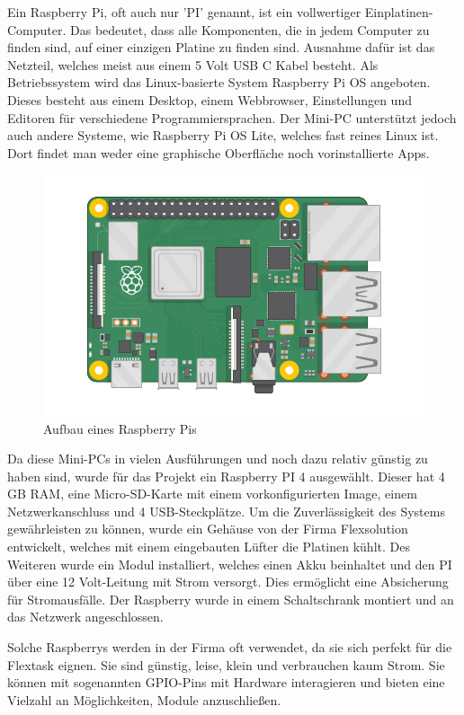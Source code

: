 Ein Raspberry Pi, oft auch nur 'PI' genannt, ist ein vollwertiger Einplatinen-Computer. Das bedeutet, dass alle Komponenten, die in jedem Computer zu finden sind, auf einer einzigen Platine zu finden sind. Ausnahme dafür ist das Netzteil, welches meist aus einem 5 Volt USB C Kabel besteht. Als Betriebssystem wird das Linux-basierte System Raspberry Pi OS angeboten. Dieses besteht aus einem Desktop, einem Webbrowser, Einstellungen und Editoren für verschiedene Programmiersprachen. Der Mini-PC unterstützt jedoch auch andere Systeme, wie Raspberry Pi OS Lite, welches fast reines Linux ist. Dort findet man weder eine graphische Oberfläche noch vorinstallierte Apps.  

\begin{figure}[h t]
    \centering
    \includegraphics[scale=0.5]{pics/raspberry-pi.png}
    \caption{Aufbau eines Raspberry Pis}
    \label{fig:impl:RaspiAufbau}
  \end{figure}

  Da diese Mini-PCs in vielen Ausführungen und noch dazu relativ günstig zu haben sind, wurde für das Projekt ein Raspberry PI 4 ausgewählt. Dieser hat 4 GB RAM, eine Micro-SD-Karte mit einem vorkonfigurierten Image, einem Netzwerkanschluss und 4 USB-Steckplätze. Um die Zuverlässigkeit des Systems gewährleisten zu können, wurde ein Gehäuse von der Firma Flexsolution entwickelt, welches mit einem eingebauten Lüfter die Platinen kühlt. Des Weiteren wurde ein Modul installiert, welches einen Akku beinhaltet und den PI über eine 12 Volt-Leitung mit Strom versorgt. Dies ermöglicht eine Absicherung für Stromausfälle. Der Raspberry wurde in einem Schaltschrank montiert und an das Netzwerk angeschlossen.   

Solche Raspberrys werden in der Firma oft verwendet, da sie sich perfekt für die Flextask eignen. Sie sind günstig, leise, klein und verbrauchen kaum Strom. Sie können mit sogenannten GPIO-Pins mit Hardware interagieren und bieten eine Vielzahl an Möglichkeiten, Module anzuschließen.   